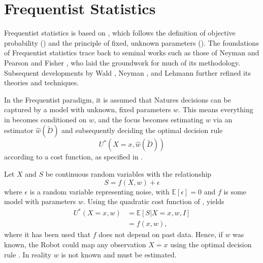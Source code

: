 \section{Frequentist Statistics}
\label{chp:freq}
Frequentist statistics is based on , which follows the definition of objective probability () and the principle of fixed, unknown parameters (). The foundations of Frequentist statistics trace back to seminal works such as those of Neyman and Pearson \citep{Neyman1928OnSR} and Fisher \citep{fisher1925statistical}, who laid the groundwork for much of its methodology. Subsequent developments by Wald \citep{Wald1945Sequential}, Neyman \citep{Neyman1948Consistent}, and Lehmann \citep{lehmann1986testing} further refined its theories and techniques.\newline

In the Frequentist paradigm, it is assumed that Natures decisions can be captured by a model with unknown, fixed parameters $w$. This means everything in  becomes conditioned on $w$, and the focus becomes estimating $w$ via an estimator $\hat{w}(\tilde{D})$ and subsequently deciding the optimal decision rule
\begin{equation}
	U^*(X=x, \hat{w}(\tilde{D}))
\end{equation}
according to a cost function, as specified in .


\begin{example}
	Let $X$ and $S$ be continuous random variables with the relationship~\cite{hastie2001}
	\begin{equation}
		S = f(X,w)+\epsilon
	\end{equation}
	where $\epsilon$ is a random variable representing noise, with $\mathbb{E}[\epsilon]=0$ and $f$ is some model with parameters $w$. Using the quadratic cost function of ,  yields
	\begin{equation}
		\label{eq:o1}
		\begin{split}
			U^*(X = x,w) &= \mathbb{E}[S|X=x,w,I]\\
			&= f(x,w),
		\end{split}
	\end{equation}
	where it has been used that $f$ does not depend on past data. Hence, if $w$ was known, the Robot could map any observation $X=x$ using the optimal decision rule . In reality $w$ is not known and must be estimated.
\end{example}

